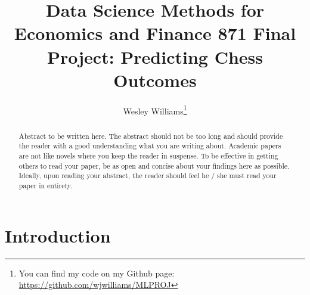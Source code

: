 \documentclass[11pt,preprint, authoryear]{elsarticle}
\numberwithin{equation}{section}
\numberwithin{figure}{section}
\numberwithin{table}{section}
\let\rmarkdownfootnote\footnote%
\def\footnote{\protect\rmarkdownfootnote}
\begin{document}
\begin{frontmatter}  %

\title{Data Science Methods for Economics and Finance 871 Final Project:
Predicting Chess Outcomes}





\author[Add1]{Wesley Williams\footnote{You can find my code on my Github
  page: \url{https://github.com/wjwilliams/MLPROJ}}}





\address[Add1]{Stellenbosch University, South Africa}


\begin{abstract}
\small{
Abstract to be written here. The abstract should not be too long and
should provide the reader with a good understanding what you are writing
about. Academic papers are not like novels where you keep the reader in
suspense. To be effective in getting others to read your paper, be as
open and concise about your findings here as possible. Ideally, upon
reading your abstract, the reader should feel he / she must read your
paper in entirety.
}
\end{abstract}

\vspace{1cm}





\vspace{0.5cm}

\end{frontmatter}

\setcounter{footnote}{0}



\pagestyle{fancy}
\chead{}
\rhead{}
\lfoot{}
\lhead{}
\cfoot{}


\headsep 35pt %




\hypertarget{introduction}{%
\section{\texorpdfstring{Introduction
\label{Introduction}}{Introduction }}\label{introduction}}
\end{document}
